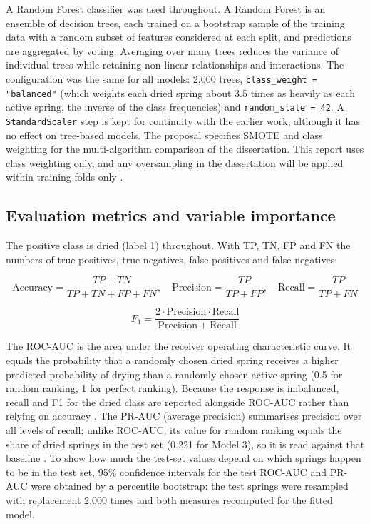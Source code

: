 \documentclass[12pt,a4paper]{article}
\begin{document}
A Random Forest classifier \citep{breiman2001} was used throughout. A Random Forest is an ensemble of decision trees, each trained on a bootstrap sample of the training data with a random subset of features considered at each split, and predictions are aggregated by voting. Averaging over many trees reduces the variance of individual trees while retaining non-linear relationships and interactions. The configuration was the same for all models: 2,000 trees, \texttt{class\_\allowbreak{}weight = "balanced"} (which weights each dried spring about 3.5 times as heavily as each active spring, the inverse of the class frequencies) and \texttt{random\_\allowbreak{}state = 42}. A \texttt{StandardScaler} step is kept for continuity with the earlier work, although it has no effect on tree-based models. The proposal specifies SMOTE \citep{chawla2002} and class weighting for the multi-algorithm comparison of the dissertation. This report uses class weighting only, and any oversampling in the dissertation will be applied within training folds only \citep{santos2018}.

\subsection{Evaluation metrics and variable importance}

The positive class is dried (label 1) throughout. With TP, TN, FP and FN the numbers of true positives, true negatives, false positives and false negatives:

\begin{equation}
\mathrm{Accuracy} = \frac{TP + TN}{TP + TN + FP + FN}, \quad \mathrm{Precision} = \frac{TP}{TP + FP}, \quad \mathrm{Recall} = \frac{TP}{TP + FN}
\end{equation}

\begin{equation}
F_1 = \frac{2 \cdot \mathrm{Precision} \cdot \mathrm{Recall}}{\mathrm{Precision} + \mathrm{Recall}}
\end{equation}

The ROC-AUC is the area under the receiver operating characteristic curve. It equals the probability that a randomly chosen dried spring receives a higher predicted probability of drying than a randomly chosen active spring (0.5 for random ranking, 1 for perfect ranking). Because the response is imbalanced, recall and F1 for the dried class are reported alongside ROC-AUC rather than relying on accuracy \citep{he2009,saito2015}. The PR-AUC (average precision) summarises precision over all levels of recall; unlike ROC-AUC, its value for random ranking equals the share of dried springs in the test set (0.221 for Model 3), so it is read against that baseline \citep{saito2015}. To show how much the test-set values depend on which springs happen to be in the test set, 95\% confidence intervals for the test ROC-AUC and PR-AUC were obtained by a percentile bootstrap: the test springs were resampled with replacement 2,000 times and both measures recomputed for the fitted model.
\end{document}
